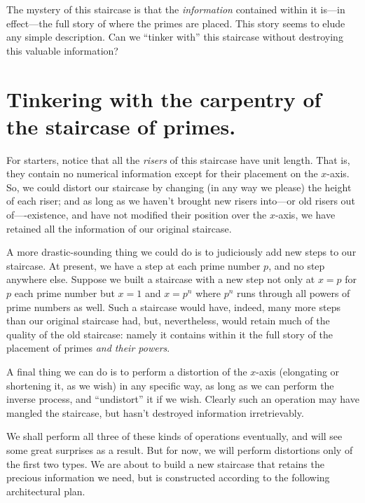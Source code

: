 \documentclass[11pt]{article}
\theoremstyle{plain}
\theoremstyle{definition}
\numberwithin{equation}{section}
\numberwithin{figure}{section}
\numberwithin{table}{section}
\begin{document}
The mystery of this staircase is that the {\em information} contained
within it is---in effect---the full story of where the primes are
placed. This story seems to elude any simple description.  Can we
``tinker with'' this staircase without destroying this valuable
information?
 

\section{Tinkering with the carpentry of the staircase of primes.}

 
For starters, notice that all the {\em risers} of this staircase have
unit length. That is, they contain no numerical information except for
their placement on the $x$-axis. So, we could distort our staircase by
changing (in any way we please) the height of each riser; and as long
as we haven't brought new risers into---or old risers out
of----existence, and have not modified their position over the
$x$-axis, we have retained all the information of our original
staircase.
   
   
A more drastic-sounding thing we could do is to judiciously add new
steps to our staircase. At present, we have a step at each prime
number $p$, and no step anywhere else. Suppose we built a staircase
with a new step not only at $x=p$ for $p$ each prime number but $x =1$
and $x=p^n$ where $p^n$ runs through all powers of prime numbers as
well. Such a staircase would have, indeed, many more steps than our
original staircase had, but, nevertheless, would retain much of the
quality of the old staircase: namely it contains within it the full
story of the placement of primes {\em and their powers}.
     
A final thing we can do is to perform a distortion of the $x$-axis
(elongating or shortening it, as we wish) in any specific way, as long
as we can perform the inverse process, and ``undistort'' it if we wish.
Clearly such an operation may have mangled the staircase, but hasn't destroyed
information irretrievably.
     
We shall perform all three of these kinds of operations eventually,
and will see some great surprises as a result.  But for now, we will
perform distortions only of the first two types.  We are about to
build a new staircase that retains the precious information we need,
but is constructed according to the following architectural plan.
 
\end{document}
